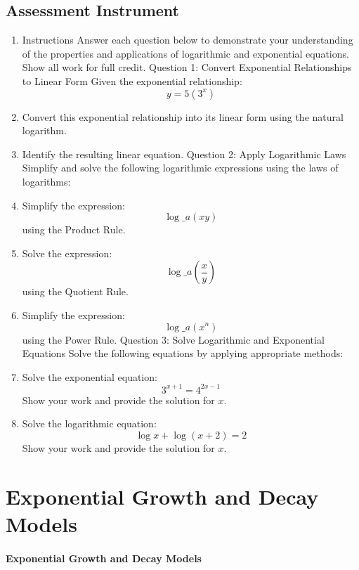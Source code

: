\subsection{Assessment Instrument}

\begin{enumerate}
    \item Instructions Answer each question below to demonstrate your understanding of the properties and applications of logarithmic and exponential equations. Show all work for full credit. Question 1: Convert Exponential Relationships to Linear Form Given the exponential relationship: $$ y = 5 (3^x) $$
    \item Convert this exponential relationship into its linear form using the natural logarithm.
    \item Identify the resulting linear equation. Question 2: Apply Logarithmic Laws Simplify and solve the following logarithmic expressions using the laws of logarithms:
    \item Simplify the expression: $$ \log\_a (xy) $$ using the Product Rule.
    \item Solve the expression: $$ \log\_a \left(\frac{x}{y}\right) $$ using the Quotient Rule.
    \item Simplify the expression: $$ \log\_a (x^n) $$ using the Power Rule. Question 3: Solve Logarithmic and Exponential Equations Solve the following equations by applying appropriate methods:
    \item Solve the exponential equation: $$ 3^{x+1} = 4^{2x-1} $$ Show your work and provide the solution for $x$.
    \item Solve the logarithmic equation: $$ \log x + \log(x+2) = 2 $$ Show your work and provide the solution for $x$.
\end{enumerate}

\section{Exponential Growth and Decay Models}
\label{sec:exponential-growth-and-decay-models}

\paragraph{Exponential Growth and Decay Models}





